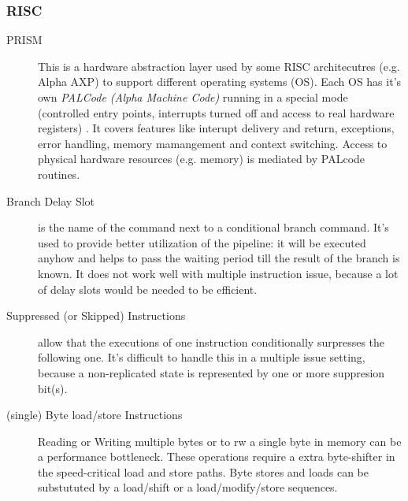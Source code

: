 \documentclass[a4paper,10pt]{article}
\begin{document}
\subsubsection{RISC}
  \begin{description}
  \item[PRISM] This is a hardware abstraction layer used by some RISC architecutres (e.g. Alpha AXP) to support different operating systems (OS). Each OS has it's own \emph{PALCode (Alpha Machine Code)} running in a special mode (controlled entry points, interrupts turned off and access to real hardware registers) \cite{alpha}. It covers features like interupt delivery and return, exceptions, error handling, memory mamangement and context switching. Access to physical hardware resources (e.g. memory) is mediated by PALcode routines.
  \item[Branch Delay Slot] is the name of the command next to a conditional branch command. It's used to provide better utilization of the pipeline: it will be executed anyhow and helps to pass the waiting period till the result of the branch is known. It does not work well with multiple instruction issue, because a lot of delay slots would be needed to be efficient\cite{alpha}.
  \item[Suppressed (or Skipped) Instructions] allow that the executions of one instruction conditionally surpresses the following one. It's difficult to handle this in a multiple issue setting, because a non-replicated state is represented by one or more suppresion bit(s)\cite{alpha}.
  \item[(single) Byte load/store Instructions] Reading or Writing multiple bytes or to rw a single byte in memory can be a performance bottleneck. These operations require a extra byte-shifter in the speed-critical load and store paths. Byte stores and loads can be substututed by a load/shift or a load/modify/store sequences.
  \end{description}
\end{document}
